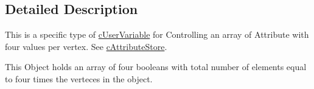 \subsection{Detailed Description}
This is a specific type of \hyperlink{classc_user_variable}{cUserVariable} for Controlling an array of Attribute with four values per vertex. See \hyperlink{classc_attribute_store}{cAttributeStore}. 

This Object holds an array of four booleans with total number of elements equal to four times the verteces in the object. 